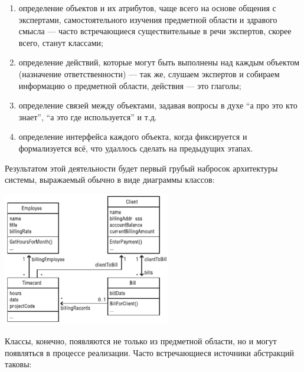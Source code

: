 \documentclass[a5paper]{article}
\begin{document}
\begin{enumerate}
	\item определение объектов и их атрибутов, чаще всего на основе общения с экспертами, самостоятельного изучения предметной области и здравого смысла --- часто встречающиеся существительные в речи экспертов, скорее всего, станут классами;
	\item определение действий, которые могут быть выполнены над каждым объектом (назначение ответственности) --- так же, слушаем экспертов и собираем информацию о предметной области, действия --- это глаголы;
	\item определение связей между объектами, задавая вопросы в духе ``а про это кто знает'', ``а это где используется'' и т.д.
	\item определение интерфейса каждого объекта, когда фиксируется и формализуется всё, что удаллось сделать на предыдущих этапах.
\end{enumerate}

Результатом этой деятельности будет первый грубый набросок архитектуры системы, выражаемый обычно в виде диаграммы классов:

\begin{center}
	\includegraphics[width=0.55\textwidth]{billDomainModel.png}
\end{center}

Классы, конечно, появляются не только из предметной области, но и могут появляться в процессе реализации. Часто встречающиеся источники абстракций таковы:
\end{document}
